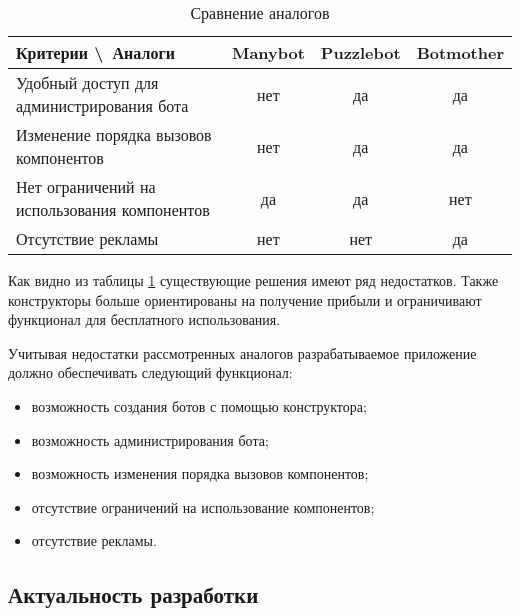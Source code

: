 \begin{table}[ht]
	\Large
	\begin{threeparttable}
		\caption{Сравнение аналогов}
		\label{t:comp-a}
		\centering
		\begin{tabularx}{\textwidth}{|X|c|c|c|}
			\hline
			Критерии \textbackslash\ Аналоги & Manybot & Puzzlebot & Botmother \\
			\hline
			Удобный доступ для администрирования бота
			                                 & нет     & да        & да        \\
			\hline
			Изменение порядка вызовов компонентов
			                                 & нет     & да        & да        \\
			\hline
			Нет ограничений на использования компонентов
			                                 & да      & да        & нет       \\
			\hline
			Отсутствие рекламы
			                                 & нет     & нет       & да        \\
			\hline
		\end{tabularx}
	\end{threeparttable}
	\vspace{\bottompaddingoftable}
\end{table}


Как видно из таблицы \ref{t:comp-a}
существующие решения имеют ряд недостатков.
Также конструкторы больше ориентированы на получение прибыли и
ограничивают функционал для бесплатного использования.

Учитывая недостатки рассмотренных аналогов разрабатываемое приложение должно обеспечивать следующий функционал:

\begin{itemize}

	\item возможность создания ботов с помощью конструктора;
	\item возможность администрирования бота;
	\item возможность изменения порядка вызовов компонентов;
	\item отсутствие ограничений на использование компонентов;
	\item отсутствие рекламы.

\end{itemize}

\subsection{Актуальность разработки}

